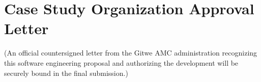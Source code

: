 \documentclass[12pt]{report}
\begin{document}
\section*{Case Study Organization Approval Letter}
(An official countersigned letter from the Gitwe AMC administration recognizing this software engineering proposal and authorizing the development will be securely bound in the final submission.)
\end{document}
